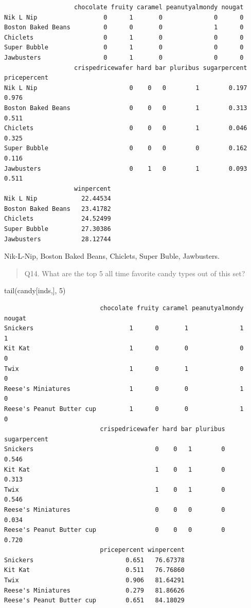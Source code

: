 \documentclass[
  letterpaper,
  DIV=11,
  numbers=noendperiod]{scrartcl}
\newenvironment{Shaded}{\begin{snugshade}}{\end{snugshade}}
\newcommand{\DecValTok}[1]{\textcolor[rgb]{0.68,0.00,0.00}{#1}}
\newcommand{\FunctionTok}[1]{\textcolor[rgb]{0.28,0.35,0.67}{#1}}
\newcommand{\NormalTok}[1]{\textcolor[rgb]{0.00,0.23,0.31}{#1}}
\begin{document}
\begin{verbatim}
                   chocolate fruity caramel peanutyalmondy nougat
Nik L Nip                  0      1       0              0      0
Boston Baked Beans         0      0       0              1      0
Chiclets                   0      1       0              0      0
Super Bubble               0      1       0              0      0
Jawbusters                 0      1       0              0      0
                   crispedricewafer hard bar pluribus sugarpercent pricepercent
Nik L Nip                         0    0   0        1        0.197        0.976
Boston Baked Beans                0    0   0        1        0.313        0.511
Chiclets                          0    0   0        1        0.046        0.325
Super Bubble                      0    0   0        0        0.162        0.116
Jawbusters                        0    1   0        1        0.093        0.511
                   winpercent
Nik L Nip            22.44534
Boston Baked Beans   23.41782
Chiclets             24.52499
Super Bubble         27.30386
Jawbusters           28.12744
\end{verbatim}

Nik-L-Nip, Boston Baked Beans, Chiclets, Super Buble, Jawbusters.

\begin{quote}
Q14. What are the top 5 all time favorite candy types out of this set?
\end{quote}

\begin{Shaded}
\begin{Highlighting}[]
\FunctionTok{tail}\NormalTok{(candy[inds,], }\DecValTok{5}\NormalTok{)}
\end{Highlighting}
\end{Shaded}

\begin{verbatim}
                          chocolate fruity caramel peanutyalmondy nougat
Snickers                          1      0       1              1      1
Kit Kat                           1      0       0              0      0
Twix                              1      0       1              0      0
Reese's Miniatures                1      0       0              1      0
Reese's Peanut Butter cup         1      0       0              1      0
                          crispedricewafer hard bar pluribus sugarpercent
Snickers                                 0    0   1        0        0.546
Kit Kat                                  1    0   1        0        0.313
Twix                                     1    0   1        0        0.546
Reese's Miniatures                       0    0   0        0        0.034
Reese's Peanut Butter cup                0    0   0        0        0.720
                          pricepercent winpercent
Snickers                         0.651   76.67378
Kit Kat                          0.511   76.76860
Twix                             0.906   81.64291
Reese's Miniatures               0.279   81.86626
Reese's Peanut Butter cup        0.651   84.18029
\end{verbatim}
\end{document}
